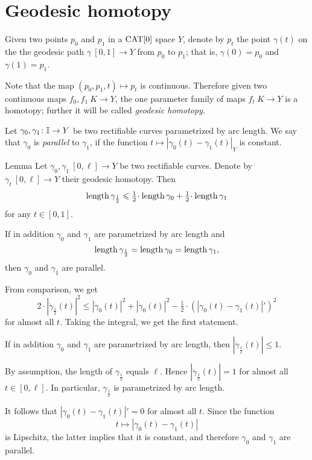 \documentclass{article}
\begin{document}
\section{Geodesic homotopy}

Given two points $p_0$ and $p_1$ in a $\mathop{\rm CAT}\nolimits[0]$ space $Y$,
denote by $p_t$ the point $\gamma(t)$ on the 
the geodesic path $\gamma\:[0,1]\to Y$ from $p_0$ to $p_1$;
that is, $\gamma(0)=p_0$ and $\gamma(1)=p_1$.

Note that the map $(p_0,p_1,t)\mapsto p_t$ is continuous.
Therefore given two continuous maps $f_0,f_1\:K\to Y$,
the one parameter family of maps $f_t\:K\to Y$ 
is a homotopy;
further it will be called \emph{geodesic homotopy}.

Let $\gamma_{0}, \gamma_1\colon\mathbb{I}\to Y$ be two rectifiable curves parametrized by arc length. 
We say that  $\gamma_{0}$ is {\em parallel} to $\gamma_{1}$, if the function $t\mapsto |\gamma_{0}(t)-\gamma_{1}(t)|_Y$ is constant.


\begin{thm}{Lemma}\label{lem:parpaths}
Let $\gamma_0,\gamma_1\:[0,\ell]\to Y$ be two rectifiable curves. 
Denote by $\gamma_t\:[0,\ell]\to Y$ their geodesic homotopy.
Then
\[\length\gamma_{\frac12}
\le \tfrac12\cdot\length\gamma_0 +\tfrac12\cdot\length\gamma_1\]
for any $t\in [0,1]$.

If in addition $\gamma_0$ and $\gamma_1$ are parametrized by arc length and 
\[\mathop{\rm length}\nolimits\gamma_{\frac12}
=\mathop{\rm length}\nolimits\gamma_0
=\mathop{\rm length}\nolimits\gamma_1,\] 
then $\gamma_{0}$ and $\gamma_{1}$ are parallel. 
\end{thm}

From comparison, we get
\[2\cdot|\dot\gamma_{\frac12}(t)|^2
\le
|\dot\gamma_{0}(t)|^2
+|\dot\gamma_{0}(t)|^2
-\tfrac12\cdot(|\gamma_{0}(t)-\gamma_{1}(t)|')^2\] 
for almost all $t$.
Taking the integral, we get the first statement.

If in addition $\gamma_0$ and $\gamma_1$ are parametrized by arc length, 
then $|\dot\gamma_{\frac12}(t)|\le 1$.

By assumption, the length of $\gamma_{\frac12}$ equals $\ell$. 
Hence $|\dot\gamma_{\frac12}(t)|=1$ for almost all $t\in[0,\ell]$. 
In particular, $\gamma_{\frac12}$
is parametrized by arc length. 

It follows that $|\gamma_{0}(t)-\gamma_{1}(t)|'=0$ for almost all $t$.
Since the function 
\[t\mapsto |\gamma_{0}(t)-\gamma_{1}(t)|\] 
is Lipschitz,
the latter  implies that it is constant,
and therefore $\gamma_{0}$ and $\gamma_{1}$ are parallel.
\qeds
\end{document}
